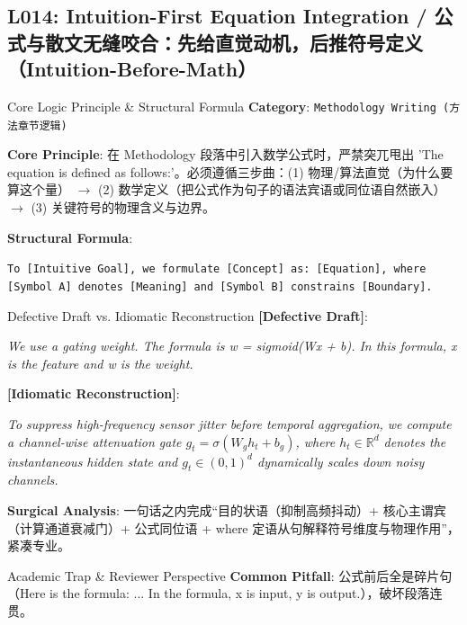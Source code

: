 \subsection{L014: Intuition-First Equation Integration / 公式与散文无缝咬合：先给直觉动机，后推符号定义（Intuition-Before-Math）}\label{sec:logic:L014}
\begin{ConceptBox}{Core Logic Principle \& Structural Formula}
\textbf{Category}: \texttt{Methodology Writing (方法章节逻辑)}\par\vspace{3pt}
\textbf{Core Principle}: 在 Methodology 段落中引入数学公式时，严禁突兀甩出 'The equation is defined as follows:'。必须遵循三步曲：(1)  物理/算法直觉（为什么要算这个量） $\to$ (2)  数学定义（把公式作为句子的语法宾语或同位语自然嵌入） $\to$ (3)  关键符号的物理含义与边界。\par\vspace{4pt}
\textbf{Structural Formula}:\par\noindent\texttt{To [Intuitive Goal], we formulate [Concept] as: [Equation], where [Symbol A] denotes [Meaning] and [Symbol B] constrains [Boundary].}
\end{ConceptBox}
\begin{ExampleBox}{Defective Draft vs. Idiomatic Reconstruction}
\textbf{\color{TargetHighlight}[Defective Draft]}:\par\textit{We use a gating weight. The formula is w = sigmoid(Wx + b). In this formula, x is the feature and w is the weight.}\par\vspace{4pt}
\textbf{\color{AcadNavy}[Idiomatic Reconstruction]}:\par\textit{To suppress high-frequency sensor jitter before temporal aggregation, we compute a channel-wise attenuation gate $g_t = \sigma(W_g h_t + b_g)$, where $h_t \in \mathbb{R}^d$ denotes the instantaneous hidden state and $g_t \in (0, 1)^d$ dynamically scales down noisy channels.}\par\vspace{4pt}
\textbf{Surgical Analysis}: 一句话之内完成“目的状语（抑制高频抖动）+ 核心主谓宾（计算通道衰减门）+ 公式同位语 + where 定语从句解释符号维度与物理作用”，紧凑专业。
\end{ExampleBox}
\begin{TipBox}{Academic Trap \& Reviewer Perspective}
\textbf{Common Pitfall}: 公式前后全是碎片句（Here is the formula: ... In the formula, x is input, y is output.），破坏段落连贯。
\end{TipBox}
\vspace{6pt}
